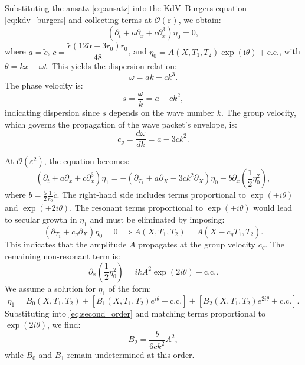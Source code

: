 \documentclass[alpha-refs, 12pt]{wiley-article}
\renewcommand{\O}{\mathcal{O}}
\newcommand{\ui}{\mathrm{i}}
\newcommand{\eps}{\varepsilon}
\begin{document}
Substituting the ansatz \eqref{eq:ansatz} into the KdV--Burgers equation \eqref{eq:kdv_burgers} and collecting terms at $\O(\eps)$, we obtain:
\begin{equation}
\label{eq:leading_order}
\left( \partial_t + a \partial_x + c \partial_x^3 \right) \eta_0 = 0,
\end{equation}
where $a = \tilde{c}$, $c = \dfrac{\tilde{c} (12 \tilde{\alpha} + 3 r_0) r_0}{48}$, and $\eta_0 = A(X, T_1, T_2) \exp(\ui \theta) + \text{c.c.}$, with $\theta = k x - \omega t$. This yields the dispersion relation:
\begin{equation}
\label{eq:dispersion}
\omega = a k - c k^3.
\end{equation}
The phase velocity is:
\[
s = \frac{\omega}{k} = a - c k^2,
\]
indicating dispersion since $s$ depends on the wave number $k$. The group velocity, which governs the propagation of the wave packet's envelope, is:
\[
c_g = \frac{d \omega}{d k} = a - 3 c k^2.
\]

At $\O(\eps^2)$, the equation becomes:
\begin{equation}
\label{eq:second_order}
\left( \partial_t + a \partial_x + c \partial_x^3 \right) \eta_1 = - \left( \partial_{T_1} + a \partial_X - 3 c k^2 \partial_X \right) \eta_0 - b \partial_x \left( \frac{1}{2} \eta_0^2 \right),
\end{equation}
where $b = \frac{5}{2} \frac{1}{r_0} \tilde{c}$. The right-hand side includes terms proportional to $\exp(\pm i \theta)$ and $\exp(\pm 2 i \theta)$. The resonant terms proportional to $\exp(\pm i \theta)$ would lead to secular growth in $\eta_1$ and must be eliminated by imposing:
\begin{equation}
\label{eq:secular_elimination}
\left( \partial_{T_1} + c_g \partial_X \right) \eta_0 = 0 \implies A(X, T_1, T_2) = A(X - c_g T_1, T_2).
\end{equation}
This indicates that the amplitude $A$ propagates at the group velocity $c_g$. The remaining non-resonant term is:
\[
\partial_x \left( \frac{1}{2} \eta_0^2 \right) = i k A^2 \exp(2 i \theta) + \text{c.c.}.
\]
We assume a solution for $\eta_1$ of the form:
\begin{equation}\label{eq:eta1_form}
  \eta_1 = B_0(X, T_1, T_2) + \left[ B_1(X, T_1, T_2) e^{i \theta} + \text{c.c.} \right] + \left[ B_2(X, T_1, T_2) e^{2 i \theta} + \text{c.c.} \right].
\end{equation}
Substituting into \eqref{eq:second_order} and matching terms proportional to $\exp(2 i \theta)$, we find:
\begin{equation}\label{eq:B2_solution}
  B_2 = \frac{b}{6 c k^2} A^2,
\end{equation}
while $B_0$ and $B_1$ remain undetermined at this order.
\end{document}

